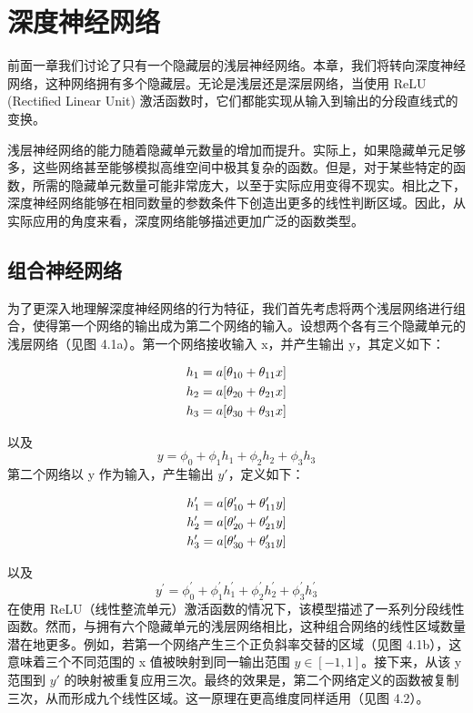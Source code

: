 \chapter{深度神经网络}
前面一章我们讨论了只有一个隐藏层的浅层神经网络。本章，我们将转向深度神经网络，这种网络拥有多个隐藏层。无论是浅层还是深层网络，当使用 ReLU (Rectified Linear Unit) 激活函数时，它们都能实现从输入到输出的分段直线式的变换。

浅层神经网络的能力随着隐藏单元数量的增加而提升。实际上，如果隐藏单元足够多，这些网络甚至能够模拟高维空间中极其复杂的函数。但是，对于某些特定的函数，所需的隐藏单元数量可能非常庞大，以至于实际应用变得不现实。相比之下，深度神经网络能够在相同数量的参数条件下创造出更多的线性判断区域。因此，从实际应用的角度来看，深度网络能够描述更加广泛的函数类型。

\section{组合神经网络}
为了更深入地理解深度神经网络的行为特征，我们首先考虑将两个浅层网络进行组合，使得第一个网络的输出成为第二个网络的输入。设想两个各有三个隐藏单元的浅层网络（见图 4.1a）。第一个网络接收输入 x，并产生输出 y，其定义如下：

\begin{align}
h_1 = a[\theta_{10}+\theta_{11}x] \notag \\
h_2 = a[\theta_{20}+\theta_{21}x] \notag \\
h_3 = a[\theta_{30}+\theta_{31}x] 
\end{align} 

以及
\begin{equation}
y = \phi_0 + \phi_1h_1 + \phi_2h_2 + \phi_3h_3 
\end{equation}
第二个网络以 y 作为输入，产生输出 \(y \prime\)，定义如下：

\begin{align}
h^\prime_1 = a[\theta^\prime_{10}+\theta^\prime_{11}y] \notag \\
h^\prime_2 = a[\theta^\prime_{20}+\theta^\prime_{21}y] \notag \\
h^\prime_3 = a[\theta^\prime_{30}+\theta^\prime_{31}y] 
\end{align} 


以及
\begin{equation}
y^\prime = \phi^\prime_0 + \phi^\prime_1h^\prime_1 + \phi^\prime_2h^\prime_2 + \phi^\prime_3h^\prime_3 
\end{equation}
在使用 ReLU（线性整流单元）激活函数的情况下，该模型描述了一系列分段线性函数。然而，与拥有六个隐藏单元的浅层网络相比，这种组合网络的线性区域数量潜在地更多。例如，若第一个网络产生三个正负斜率交替的区域（见图 4.1b），这意味着三个不同范围的 x 值被映射到同一输出范围 \(y \in [−1, 1]\)。接下来，从该 y 范围到 \(y \prime\) 的映射被重复应用三次。最终的效果是，第二个网络定义的函数被复制三次，从而形成九个线性区域。这一原理在更高维度同样适用（见图 4.2）。



